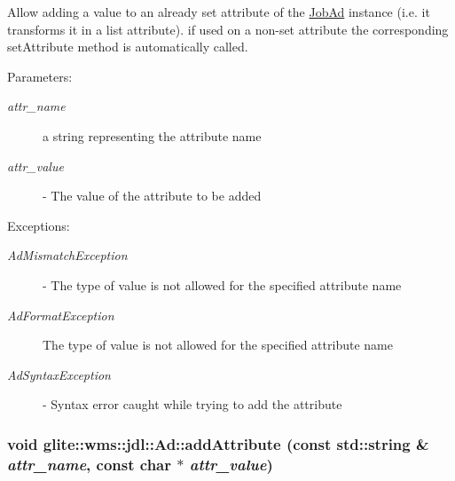 Allow adding a value to an already set attribute of the \hyperlink{classglite_1_1wms_1_1jdl_1_1JobAd}{Job\-Ad} instance (i.e. it transforms it in a list attribute). if used on a non-set attribute the corresponding set\-Attribute method is automatically called. \begin{Desc}
\item[Parameters:]
\begin{description}
\item[{\em attr\_\-name}]a string representing the attribute name \item[{\em attr\_\-value}]- The value of the attribute to be added \end{description}
\end{Desc}
\begin{Desc}
\item[Exceptions:]
\begin{description}
\item[{\em Ad\-Mismatch\-Exception}]- The type of value is not allowed for the specified attribute name \item[{\em Ad\-Format\-Exception}]The type of value is not allowed for the specified attribute name \item[{\em Ad\-Syntax\-Exception}]- Syntax error caught while trying to add the attribute \end{description}
\end{Desc}
\hypertarget{classglite_1_1wms_1_1jdl_1_1Ad_z19_6}{
\subsubsection[addAttribute]{\setlength{\rightskip}{0pt plus 5cm}void glite::wms::jdl::Ad::add\-Attribute (const std::string \& {\em attr\_\-name}, const char $\ast$ {\em attr\_\-value})}}
\label{classglite_1_1wms_1_1jdl_1_1Ad_z19_6}


